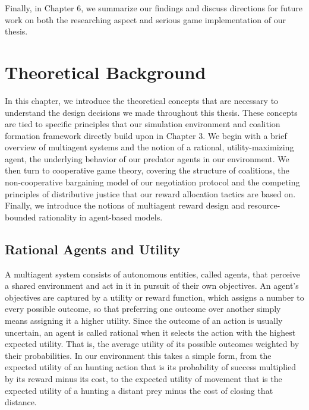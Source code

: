 \documentclass[12pt,a4paper]{report}
\begin{document}
	Finally, in Chapter 6, we summarize our findings and discuss directions for future work on both the researching aspect and serious game implementation of our thesis. \\
	\chapter{Theoretical Background}
	\label{ch:background}
	
	In this chapter, we introduce the theoretical concepts that are necessary to understand the design decisions we made throughout this thesis. These concepts are tied to specific principles that our simulation environment and coalition formation framework directly build upon in Chapter 3. We begin with a brief overview of multiagent systems and the notion of a rational, utility-maximizing agent, the underlying behavior of our predator agents in our environment. We then turn to cooperative game theory, covering the structure of coalitions, the non-cooperative bargaining model of our negotiation protocol and the competing principles of distributive justice that our reward allocation tactics are based on. Finally, we introduce the notions of multiagent reward design and resource-bounded rationality in agent-based models.
	
	\section{Rational Agents and Utility}
	
	A multiagent system consists of autonomous entities, called agents, that perceive a shared environment and act in it in pursuit of their own objectives. An agent’s objectives are captured by a utility or reward function, which assigns a number to every possible outcome, so that preferring one outcome over another simply means assigning it a higher utility. Since the outcome of an action is usually uncertain, an agent is called rational when it selects the action with the highest expected utility. That is, the average utility of its possible outcomes weighted by their probabilities. In our environment this takes a simple form, from the expected utility of an hunting action that is its probability of success multiplied by its reward minus its cost, to the expected utility of movement that is the expected utility of a hunting a distant prey minus the cost of closing that distance. \\
\end{document}
